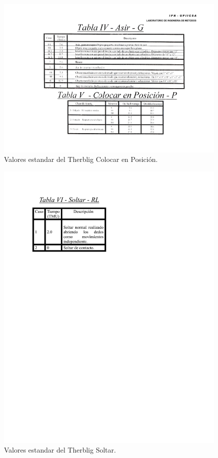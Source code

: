 \begin{figure}[H]
    \centering
    \includegraphics[scale=0.45]{15/img/tabla5ColocarPosicion.pdf}
    \caption{Valores estandar del Therblig Colocar en Posición.}
    \label{fig:tabla5ColocarPosicion}
\end{figure}
    
\begin{figure}[H]    
    \centering
    \includegraphics[scale=0.6]{15/img/tabla6Soltar.pdf}
    \caption{Valores estandar del Therblig Soltar.}
    \label{fig:tabla6Soltar}
\end{figure}

